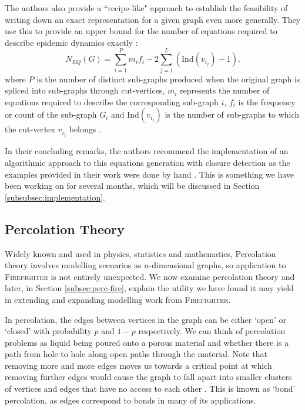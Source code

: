 \documentclass[../report.tex]{subfiles}
\begin{document}
The authors also provide a ``recipe-like" approach to establish the feasibility of writing down an exact representation for a given graph even more generally. They use this to provide an upper bound for the number of equations required to describe epidemic dynamics exactly \cite{kiss_2014}:
$$
\displaystyle N_{EQ}(G)=\sum^P_{i=1}m_if_i - 2\sum^{L}_{j=1}(\text{Ind}(v_{i_j})-1).
$$
where $P$ is the number of distinct sub-graphs produced when the original graph is spliced into sub-graphs through cut-vertices, $m_i$ represents the number of equations required to describe the corresponding sub-graph $i$, $f_i$ is the frequency or count of the sub-graph $G_i$ and $\text{Ind}(v_{i_j})$ is the number of sub-graphs to which the cut-vertex $v_{i_j}$ belongs \cite{kiss_2014}.

In their concluding remarks, the authors recommend the implementation of an algorithmic approach to this equations generation with closure detection as the examples provided in their work were done by hand \cite{kiss_2014}. This is something we have been working on for several months, which will be discussed in Section \ref{subsubsec:implementation}. 



\subsection{Percolation Theory}
\label{sec:perc}

Widely known and used in physics, statistics and mathematics, Percolation theory involves modelling scenarios as $n$-dimensional graphs, so application to {\scshape Firefighter} is not entirely unexpected. We now examine percolation theory and later, in Section \ref{subsec:perc-fire}, explain the utility we have found it may yield in extending and expanding modelling work from {\scshape Firefighter}.

In percolation, the edges between vertices in the graph can be either `open' or `closed' with probability $p$ and $1-p$ respectively. We can think of percolation problems as liquid being poured onto a porous material and whether there is a path from hole to hole along open paths through the material. Note that removing more and more edges moves us towards a critical point at which removing further edges would cause the graph to fall apart into smaller clusters of vertices and edges that have no access to each other \cite{grimmett_1999}. This is known as `bond' percolation, as edges correspond to bonds in many of its applications.
\end{document}
